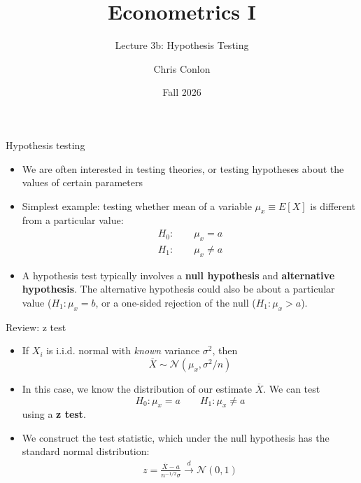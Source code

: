 \documentclass[aspectratio=169,11pt]{beamer}
\title[L4 - Inference and Standard Errors]{ Econometrics I}
\subtitle{Lecture 3b: Hypothesis Testing}
\author{Chris Conlon}
\date{Fall 2026}
\begin{document}
\maketitle





\begin{frame}{Hypothesis testing}
\begin{itemize}
	\item We are often interested in testing theories, or testing hypotheses about
	the values of certain parameters

	\medskip
	\item Simplest example: testing whether mean of a variable $\mu_x \equiv E\left[X\right]$ 
	is different from a particular value:\[
\begin{array}{c}
H_{0}:\qquad\mu_{x}=a\\
H_{1}:\qquad\mu_{x}\ne a
\end{array}
\]

	\medskip
	\item A hypothesis test typically involves a {\bf null hypothesis} and {\bf alternative hypothesis}. 
	The alternative hypothesis could also be about a particular value ($H_{1}:\mu_{x}= b$, or 
	a one-sided rejection of the null ($H_{1}:\mu_{x}>a$).


\end{itemize}
\end{frame}



\begin{frame}{Review: z test}
\begin{itemize}
	\item If $X_i$ is i.i.d. normal with \emph{known} variance $\sigma^2$, then \[
		\overline{X} \sim \mathcal{N} \left( \mu_x, \sigma^{2}/n \right)
	\]


	\item In this case, we know the distribution of our estimate $\overline{X}$. We can test\[
H_{0}:\mu_{x}=a \qquad H_{1}:\mu_{x}\ne a
\]
using a {\bf z test}.

	\item We construct the test statistic, which under the null hypothesis has the standard normal distribution:
	\begin{align*}		z = \frac{ \overline{X} - a}{n^{-1/2}\sigma}
	 \overset{d}{\to} \mathcal{N} \left( 0,1\right)
	 \end{align*}
\end{itemize}
\end{frame}
\end{document}
